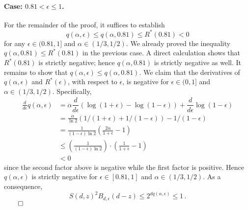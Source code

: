   \paragraph{Case: $0.81 < \epsilon \leq 1$.}
  For the remainder of the proof, it suffices to establish
  \[
      q(\alpha, \epsilon) \leq q(\alpha, 0.81) \leq R^*(0.81) < 0
  \]
  for any $\epsilon \in (0.81, 1]$ and $\alpha \in (1/3, 1/2)$. 
  We already proved the inequality $q(\alpha, 0.81) \leq R^*(0.81)$ in the previous case. 
  A direct calculation shows that $R^*(0.81)$ is strictly negative; 
  hence $q(\alpha, 0.81)$ is strictly negative as well. 
  It remains to show that $q(\alpha, \epsilon) \leq q(\alpha, 0.81)$.
  We claim that the derivatives of $q(\alpha, \epsilon)$ and $R^*(\epsilon)$, 
  with respect to $\epsilon$, is negative for $\epsilon \in (0, 1]$ and $\alpha \in (1/3, 1/2)$. 
  Specifically,
  \begin{align*}
      \frac{d}{d\epsilon} q(\alpha, \epsilon)
      &= \alpha \dfrac{d}{d\epsilon} \left( \log(1+\epsilon) - \log(1-\epsilon)\right) 
          + \dfrac{d}{d\epsilon} \log(1-\epsilon) \\
      &= \frac{\alpha}{\ln 2}\left( 1/(1+\epsilon) + 1/(1-\epsilon)\right)
          - 1/(1-\epsilon) \\
      &= \frac{1}{(1-\epsilon)\ln 2}\left( \frac{2\alpha}{1+\epsilon} - 1\right) \\
      &\leq \left(\frac{1}{(1-\epsilon)\ln 2} \right) \cdot \left( \frac{1}{1+\epsilon} - 1\right) \\
      &< 0
  \end{align*}
  since the second factor above is negative while the first factor is positive.
  Hence $q(\alpha, \epsilon)$ is strictly negative for 
  $\epsilon \in [0.81, 1]$ and $\alpha \in (1/3, 1/2)$. 
  As a consequence,
  \[
      S(d, z)^2 B_{d,\epsilon}(d-z) 
      \leq 2^{d q(\alpha, \epsilon)} 
      \leq 1
      \,.
  \]
  \hfill$\qed$